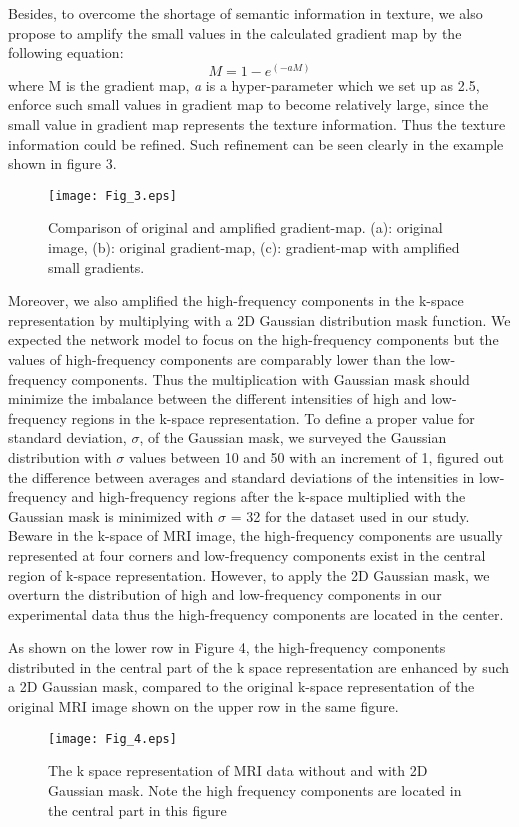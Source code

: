 \documentclass[runningheads]{llncs}
\begin{document}
Besides, to overcome the shortage of semantic information in texture, we also propose to amplify the small values in the calculated gradient map by the following equation:
\begin{equation}
M = 1 - e^{(-aM)}
\end{equation}
where M is the gradient map, \textit{a} is a hyper-parameter which we set up as 2.5, enforce such small values in gradient map to become relatively large, since the small value in gradient map represents the texture information. Thus the texture information could be refined. Such refinement can be seen clearly in the example shown in figure 3.

\begin{figure}
\texttt{[image: Fig\_3.eps]}
\caption{Comparison of original and amplified gradient-map. (a): original image, (b): original gradient-map, (c): gradient-map with amplified small gradients.} \label{Fig_3}
\end{figure}

Moreover, we also amplified the high-frequency components in the k-space representation by multiplying with a 2D Gaussian distribution mask function. We expected the network model to focus on the high-frequency components but the values of high-frequency components are comparably lower than the low-frequency components. Thus the multiplication with Gaussian mask should minimize the imbalance between the different intensities of high and low-frequency regions in the k-space representation. To define a proper value for standard deviation, $\sigma$, of the Gaussian mask, we surveyed the Gaussian distribution with $\sigma$ values between 10 and 50 with an increment of 1, figured out the difference between averages and standard deviations of the intensities in low-frequency and high-frequency regions after the k-space multiplied with the Gaussian mask is minimized with $\sigma$ = 32 for the dataset used in our study. Beware in the k-space of MRI image, the high-frequency components are usually represented at four corners and low-frequency components exist in the central region of k-space representation. However, to apply the 2D Gaussian mask, we overturn the distribution of high and low-frequency components in our experimental data thus the high-frequency components are located in the center.

As shown on the lower row in Figure 4, the high-frequency components distributed in the central part of the k space representation are enhanced by such a 2D Gaussian mask, compared to the original k-space representation of the original MRI image shown on the upper row in the same figure.
\begin{figure}
\texttt{[image: Fig\_4.eps]}
\caption{The k space representation of MRI data without and with 2D Gaussian mask. Note the high frequency components are located in the central part in this figure} \label{Fig_4}
\end{figure}
\end{document}
